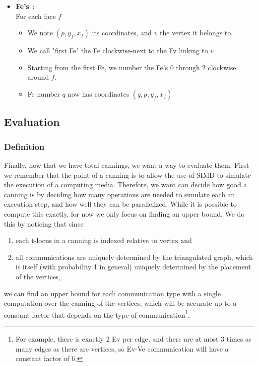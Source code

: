 \documentclass{article}
\begin{document}
\begin{itemize}
	\item \textbf{Fe's}~:\\
	For each face $f$ 
	\begin{itemize}[noitemsep, nosep, label=-]
		\item We note $(p, y_f, x_f)$ its coordinates, and $v$ the vertex it belongs to.
		\item We call "first Fe" the Fe clockwise-next to the Fv linking to $v$
		\item Starting from the first Fe, we number the Fe's 0 through 2 clockwise around $f$.
		\item Fe number $q$ now has coordinates $(q, p, y_f, x_f)$
	\end{itemize}
\end{itemize}

\subsection{Evaluation}

\subsubsection{Definition}

\newcommand{\footnoteConstantFactor}{
	For example, there is exactly 2 Ev per edge, and there are at most 3 times as many edges as there are vertices, so Ev-Ve communication will have a constant factor of 6.
}

Finally, now that we have total cannings, we want a way to evaluate them. First we remember that the point of a canning is to allow the use of SIMD to simulate the execution of a computing media. Therefore, we want can decide how good a canning is by deciding how many operations are needed to simulate each an execution step, and how well they can be parallelized. While it is possible to compute this exactly, for now we only focus on finding an upper bound. We do this by noticing that since
\begin{enumerate}
	\item each t-locus in a canning is indexed relative to vertex and
	\item all communications are uniquely determined by the triangulated graph, which is itself (with probability 1 in general) uniquely determined by the placement of the vertices,
\end{enumerate}
we can find an upper bound for each communication type with a single computation over the canning of the vertices, which will be accurate up to a constant factor that depends on the type of communication\footnote{\footnoteConstantFactor}.
\end{document}
